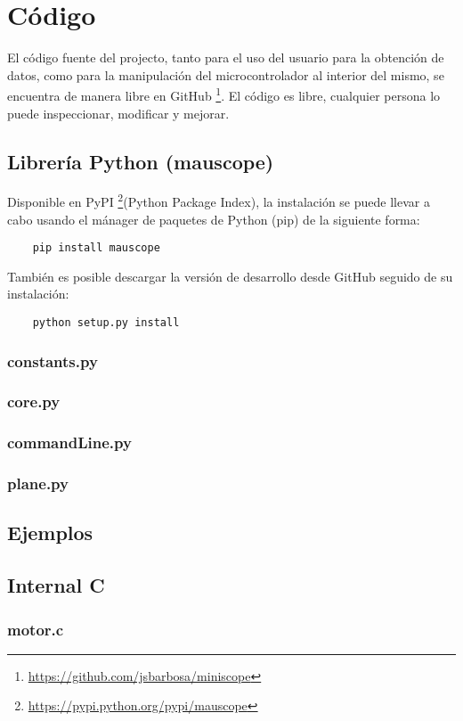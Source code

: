 \chapter{Código}\label{ch:userside}
El código fuente del projecto, tanto para el uso del usuario para la obtención de datos, como para la manipulación del microcontrolador al interior del mismo, se encuentra de manera libre en GitHub \footnote{\url{https://github.com/jsbarbosa/miniscope}}. El código es libre, cualquier persona lo puede inspeccionar, modificar y mejorar.

\section{Librería Python (mauscope)}
Disponible en PyPI \footnote{\url{https://pypi.python.org/pypi/mauscope}}(Python Package Index), la instalación se puede llevar a cabo usando el mánager de paquetes de Python (pip) de la siguiente forma:
\begin{lstlisting}
	pip install mauscope
\end{lstlisting}

También es posible descargar la versión de desarrollo desde GitHub seguido de su instalación:
\begin{lstlisting}
	python setup.py install
\end{lstlisting}

\subsection{constants.py}
	
\subsection{core.py}
	
\subsection{commandLine.py}
	
\subsection{plane.py}
	


\section{Ejemplos}

\section{Internal C}\label{ch:internal}
\subsection{motor.c}
